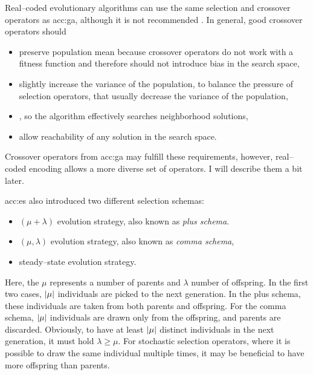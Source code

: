 Real--coded evolutionary algorithms can use the same selection and crossover operators as \acrshort{acc:ga}, although it is not recommended \citet{IntroductionToEA}. In general, good crossover operators should
\begin{itemize}
    \item preserve population mean because crossover operators do not work with a fitness function and therefore should not introduce bias in the search space,
    \item slightly increase the variance of the population, to balance the pressure of selection operators, that usually decrease the variance of the population,
    \item\label{enum:espopulationvariance} \snipescondition, so the algorithm effectively searches neighborhood solutions,
    \item allow reachability of any solution in the search space.
\end{itemize}
Crossover operators from \acrshort{acc:ga} may fulfill these requirements, however, real--coded encoding allows a more diverse set of operators. I will describe them a bit later.

\acrshort{acc:es} also introduced two different selection schemas:
\begin{itemize}
    \item $\left(\mu+\lambda\right)$ evolution strategy, also known as \emph{plus schema}.
    \item  $\left(\mu,\lambda\right)$ evolution strategy, also known as \emph{comma schema},
    \item\label{enum:steadystate} steady--state evolution strategy.
\end{itemize}
Here, the $\mu$ represents a number of parents and $\lambda$ number of offspring. In the first two cases, $\left|{\mu}\right|$ individuals are picked to the next generation. In the plus schema, these individuals are taken from both parents and offspring. For the comma schema, $\left|{\mu}\right|$ individuals are drawn only from the offspring, and parents are discarded. Obviously, to have at least $\left|{\mu}\right|$ distinct individuals in the next generation, it must hold $\lambda\geq\mu$. For stochastic selection operators, where it is possible to draw the same individual multiple times, it may be beneficial to have more offspring than parents.

